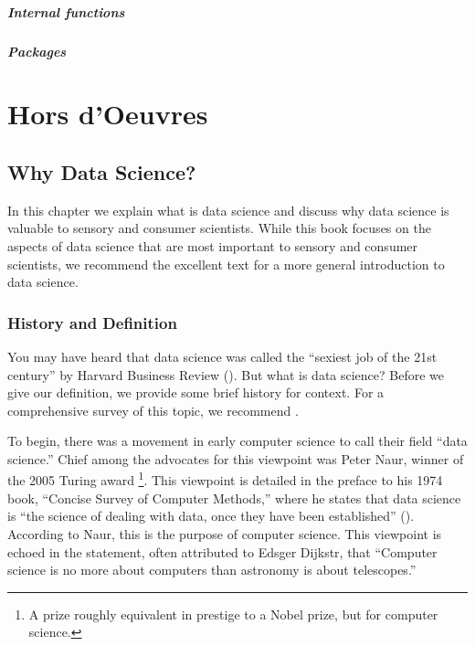 \documentclass[
]{book}
\begin{document}
\hypertarget{internal-functions}{%
\subsubsection{Internal functions}\label{internal-functions}}

\hypertarget{packages}{%
\subsubsection{Packages}\label{packages}}

\hypertarget{part-hors-doeuvres}{%
\part*{Hors d'Oeuvres}\label{part-hors-doeuvres}}

\hypertarget{data_science}{%
\chapter{Why Data Science?}\label{data_science}}

In this chapter we explain what is data science and discuss why data science is valuable to sensory and consumer scientists. While this book focuses on the aspects of data science that are most important to sensory and consumer scientists, we recommend the excellent text \citet{Wickham2016} for a more general introduction to data science.

\hypertarget{history-and-definition}{%
\section{History and Definition}\label{history-and-definition}}

You may have heard that data science was called the ``sexiest job of the 21st century'' by Harvard Business Review (\citet{Davenport2012}). But what is data science? Before we give our definition, we provide some brief history for context. For a comprehensive survey of this topic, we recommend \citet{Cao2017}.

To begin, there was a movement in early computer science to call their field ``data science.'' Chief among the advocates for this viewpoint was Peter Naur, winner of the 2005 Turing award \footnote{A prize roughly equivalent in prestige to a Nobel prize, but for computer science.}. This viewpoint is detailed in the preface to his 1974 book, ``Concise Survey of Computer Methods,'' where he states that data science is ``the science of dealing with data, once they have been established'' (\citet{Naur1974}). According to Naur, this is the purpose of computer science. This viewpoint is echoed in the statement, often attributed to Edsger Dijkstr, that ``Computer science is no more about computers than astronomy is about telescopes.''
\end{document}
